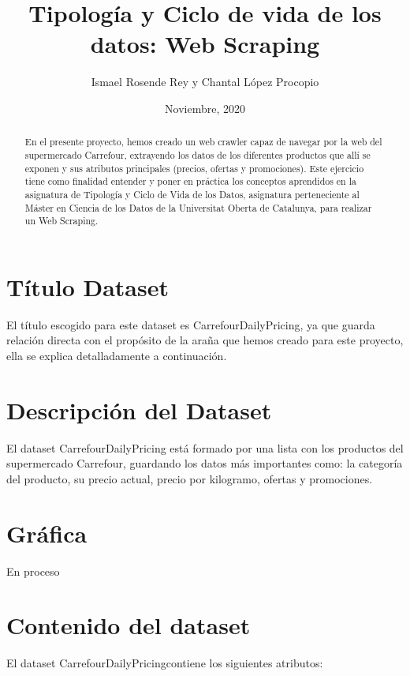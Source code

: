 \documentclass{article}
\title{Tipología y Ciclo de vida de los datos: Web Scraping}
\author{Ismael Rosende Rey y Chantal López Procopio}
\date{Noviembre, 2020}
\begin{document}
\maketitle

\begin{abstract}
    En  el  presente  proyecto,  hemos creado un  web  crawler  capaz  de  navegar  por  la  web  del supermercado Carrefour, extrayendo los  datos  de los diferentes  productos que allí se exponen y sus atributos principales (precios,  ofertas  y promociones). Este ejercicio tiene como finalidad entender y poner en práctica los conceptos aprendidos  en la  asignatura  de Tipología  y  Ciclo  de  Vida  de  los  Datos, asignatura perteneciente al Máster en Ciencia de los Datos de la Universitat Oberta de Catalunya, para  realizar  un Web Scraping.
\end{abstract}

\section{Título Dataset}
El título escogido para este dataset es CarrefourDailyPricing, ya que guarda relación directa con el propósito de la araña que hemos creado para este proyecto, ella se explica detalladamente a continuación.

\section{Descripción del Dataset}
El dataset CarrefourDailyPricing está formado por una lista con los productos del supermercado Carrefour, guardando los datos más importantes como: la categoría del producto, su precio actual, precio por kilogramo, ofertas y promociones.

\section{Gráfica}
En proceso

\section{Contenido del dataset}
El dataset CarrefourDailyPricingcontiene los siguientes atributos:
\end{document}
